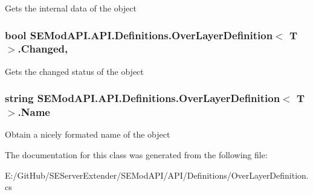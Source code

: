Gets the internal data of the object 

\hypertarget{class_s_e_mod_a_p_i_1_1_a_p_i_1_1_definitions_1_1_over_layer_definition_af7a6e8513be271e5d5cf55d45ea1c6ac}{}
\subsubsection[{Changed}]{\setlength{\rightskip}{0pt plus 5cm}bool {\bf S\+E\+Mod\+A\+P\+I.\+A\+P\+I.\+Definitions.\+Over\+Layer\+Definition}$<$ T $>$.Changed\hspace{0.3cm}{\ttfamily [get]}, {}}\label{class_s_e_mod_a_p_i_1_1_a_p_i_1_1_definitions_1_1_over_layer_definition_af7a6e8513be271e5d5cf55d45ea1c6ac}


Gets the changed status of the object 

\hypertarget{class_s_e_mod_a_p_i_1_1_a_p_i_1_1_definitions_1_1_over_layer_definition_abe587f8ec4dc9e52de1d1726096f6d9e}{}
\subsubsection[{Name}]{\setlength{\rightskip}{0pt plus 5cm}string {\bf S\+E\+Mod\+A\+P\+I.\+A\+P\+I.\+Definitions.\+Over\+Layer\+Definition}$<$ T $>$.Name\hspace{0.3cm}{\ttfamily [get]}}\label{class_s_e_mod_a_p_i_1_1_a_p_i_1_1_definitions_1_1_over_layer_definition_abe587f8ec4dc9e52de1d1726096f6d9e}


Obtain a nicely formated name of the object 



The documentation for this class was generated from the following file\+:\begin{DoxyCompactItemize}
\item 
E\+:/\+Git\+Hub/\+S\+E\+Server\+Extender/\+S\+E\+Mod\+A\+P\+I/\+A\+P\+I/\+Definitions/Over\+Layer\+Definition.\+cs\end{DoxyCompactItemize}
